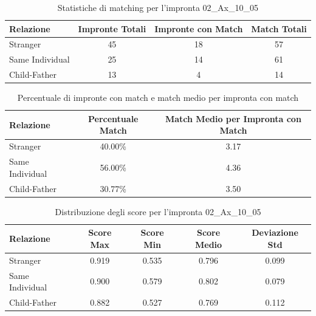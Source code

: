 \begin{table}[htbp]
\centering
\caption{Statistiche di matching per l'impronta 02\_Ax\_10\_05}
\label{tab:results_02_Ax_10_05}
\begin{tabular}{|l|c|c|c|}
\hline
\textbf{Relazione} & \textbf{Impronte Totali} & \textbf{Impronte con Match} & \textbf{Match Totali} \\
\hline
Stranger & 45 & 18 & 57 \\
\hline
Same Individual & 25 & 14 & 61 \\
\hline
Child-Father & 13 & 4 & 14 \\
\hline
\end{tabular}
\end{table}


\begin{table}[htbp]
\centering
\caption{Percentuale di impronte con match e match medio per impronta con match}
\label{tab:match_percentage_02_Ax_10_05}
\begin{tabular}{|l|c|c|}
\hline
\textbf{Relazione} & \textbf{Percentuale Match} & \textbf{Match Medio per Impronta con Match} \\
\hline
Stranger & 40.00\% & 3.17 \\
\hline
Same Individual & 56.00\% & 4.36 \\
\hline
Child-Father & 30.77\% & 3.50 \\
\hline
\end{tabular}
\end{table}


\begin{table}[htbp]
\centering
\caption{Distribuzione degli score per l'impronta 02\_Ax\_10\_05}
\label{tab:scores_02_Ax_10_05}
\begin{tabular}{|l|c|c|c|c|}
\hline
\textbf{Relazione} & \textbf{Score Max} & \textbf{Score Min} & \textbf{Score Medio} & \textbf{Deviazione Std} \\
\hline
Stranger & 0.919 & 0.535 & 0.796 & 0.099 \\
\hline
Same Individual & 0.900 & 0.579 & 0.802 & 0.079 \\
\hline
Child-Father & 0.882 & 0.527 & 0.769 & 0.112 \\
\hline
\end{tabular}
\end{table}


